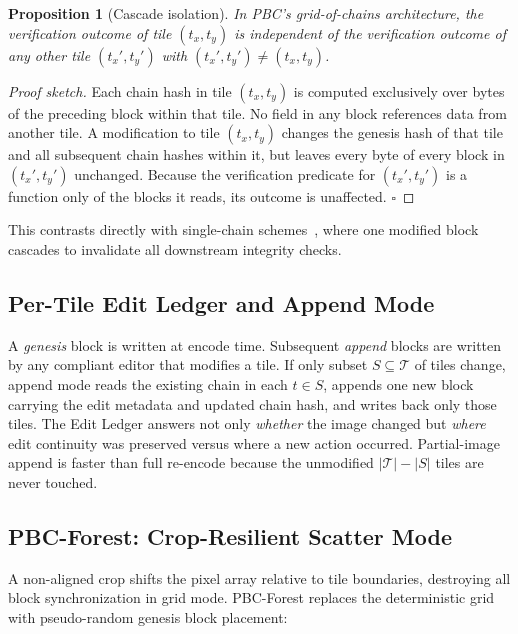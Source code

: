 \documentclass[conference]{IEEEtran}
\newtheorem{proposition}{Proposition}
\begin{document}
\begin{proposition}[Cascade isolation]
\label{prop:isolation}
In PBC's grid-of-chains architecture, the verification outcome of tile
$(t_x, t_y)$ is independent of the verification outcome of any other
tile $(t_x', t_y')$ with $(t_x', t_y') \neq (t_x, t_y)$.
\end{proposition}

\begin{proof}[Proof sketch]
Each chain hash in tile $(t_x, t_y)$ is computed exclusively over bytes
of the preceding block within that tile. No field in any block
references data from another tile. A modification to tile $(t_x, t_y)$
changes the genesis hash of that tile and all subsequent chain hashes
within it, but leaves every byte of every block in $(t_x', t_y')$
unchanged. Because the verification predicate for $(t_x', t_y')$ is a
function only of the blocks it reads, its outcome is unaffected.
\hfill$\square$
\end{proof}

This contrasts directly with single-chain
schemes~\cite{he2008blockchain,fang2020blockchain}, where one modified
block cascades to invalidate all downstream integrity checks.

\subsection{Per-Tile Edit Ledger and Append Mode}

A \emph{genesis} block is written at encode time. Subsequent
\emph{append} blocks are written by any compliant editor that modifies a
tile. If only subset $S \subseteq \mathcal{T}$ of tiles change, append
mode reads the existing chain in each $t \in S$, appends one new block
carrying the edit metadata and updated chain hash, and writes back only
those tiles. The Edit Ledger answers not only \emph{whether} the image
changed but \emph{where} edit continuity was preserved versus where a
new action occurred. Partial-image append is faster than full re-encode
because the unmodified $|\mathcal{T}| - |S|$ tiles are never touched.

\subsection{PBC-Forest: Crop-Resilient Scatter Mode}

A non-aligned crop shifts the pixel array relative to tile boundaries,
destroying all block synchronization in grid mode. PBC-Forest replaces
the deterministic grid with pseudo-random genesis block placement:
\end{document}
